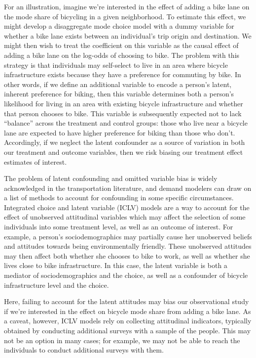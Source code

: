 For an illustration, imagine we're interested in the effect of adding a bike lane on the mode share of bicycling in a given neighborhood.
To estimate this effect, we might develop a disaggregate mode choice model with a dummy variable for whether a bike lane exists between an individual's trip origin and destination.
We might then wish to treat the coefficient on this variable as the causal effect of adding a bike lane on the log-odds of choosing to bike.
The problem with this strategy is that individuals may self-select to live in an area where bicycle infrastructure exists because they have a preference for commuting by bike.
In other words, if we define an additional variable to encode a person's latent, inherent preference for biking, then this variable determines both a person's likelihood for living in an area with existing bicycle infrastructure and whether that person chooses to bike.
This variable is subsequently expected not to lack ``balance'' across the treatment and control groups: those who live near a bicycle lane are expected to have higher preference for biking than those who don't.
Accordingly, if we neglect the latent confounder as a source of variation in both our treatment and outcome variables,
then we risk biasing our treatment effect estimates of interest.

The problem of latent confounding and omitted variable bias is widely
acknowledged in the transportation literature, and demand modelers can draw on
a list of methods to account for confounding in some specific circumstances.
Integrated choice and latent variable (ICLV) models are a way to account for
the effect of unobserved attitudinal variables which may affect the selection
of some individuals into some treatment level, as well as an outcome of
interest. For example, a person's sociodemographics may partially cause her
unobserved beliefs and attitudes towards being environmentally friendly.
These unobserved attitudes may then affect both whether she chooses to bike to
work, as well as whether she lives close to bike infrastructure.
In this case, the latent variable is both a mediator of sociodemographics and
the choice, as well as a confounder of bicycle infrastructure level and the
choice.

Here, failing to account for the latent attitudes may bias our observational study
if we're interested in the effect on bicycle mode share from adding a bike lane.
As a caveat, however, ICLV models rely on
collecting attitudinal indicators, typically obtained by conducting
additional surveys with a sample of the people. This may not be an option in
many cases; for example, we may not be able to reach the individuals to conduct additional surveys with them.


